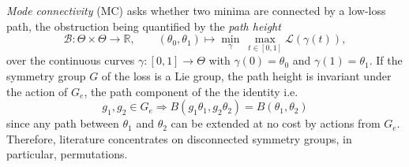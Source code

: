 \documentclass[mathematics,review,submit,moreauthors]{Definitions/mdpi}
\begin{document}
\emph{Mode connectivity} (MC) \citep{garipov2018,draxler2018p3icml} asks whether two minima are connected by a low-loss path, the obstruction being quantified by the \emph{path height}
\begin{equation}\label{eq:barrier-height}
    \mathcal{B}:\Theta\times\Theta\to\mathbb{R},\qquad(\theta_0,\theta_1)\longmapsto\min_{\gamma}\ \max_{t\in[0,1]}\mathcal{L}(\gamma(t)),
\end{equation}
over the continuous curves $\gamma:[0,1]\to\Theta$ with $\gamma(0)=\theta_0$ and $\gamma(1)=\theta_1$.
If the symmetry group $G$ of the loss is a Lie group, the path height is invariant under the action of $G_e$, the path component \citep{baker2003} of the the identity i.e.
$$
    g_1, g_2\in G_e \Rightarrow B(g_1\theta_1, g_2\theta_2)=B(\theta_1, \theta_2)
$$
since any path between $\theta_1$ and $\theta_2$ can be extended at no cost by actions from $G_e$. 
Therefore, literature concentrates on disconnected symmetry groups, in particular, permutations.
\end{document}
